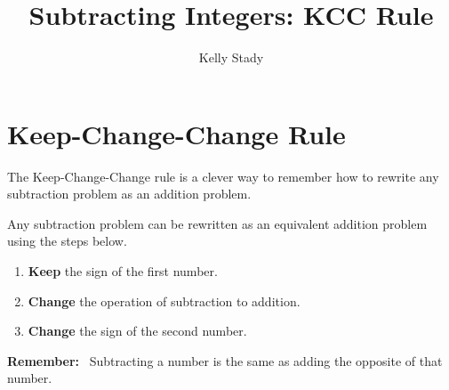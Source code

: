 \documentclass{ximera}[font=12pt]
\title{Subtracting Integers: KCC Rule}   %
\author{Kelly Stady}
\begin{document}
\begin{abstract}

\end{abstract}

\maketitle
\label{xim:SubtractIntKCCActivity}

\section*{Keep-Change-Change Rule}

The Keep-Change-Change rule is a clever way to remember how to rewrite any subtraction problem as an addition problem.

\begin{procedure}

Any subtraction problem can be rewritten as an equivalent addition problem using the steps below.

\begin{enumerate}
\item \textbf{Keep} the sign of the first number.

\item \textbf{Change} the operation of subtraction to addition.

\item \textbf{Change} the sign of the second number.

\end{enumerate}

\textcolor{orange!80!black}{\textbf{Remember:}}  \ Subtracting a number is the same as adding the opposite of that number.
\end{procedure}
\end{document}
